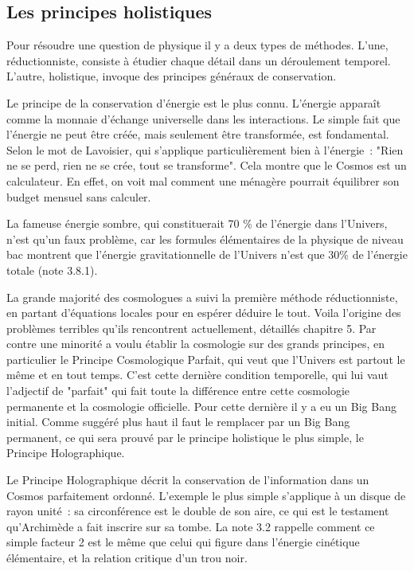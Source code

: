 \documentclass[a4paper,12pt]{article}
\begin{document}
\subsection{Les principes holistiques}

Pour résoudre une question de physique il y a deux types de méthodes. L'une, réductionniste, consiste à étudier chaque détail dans un déroulement temporel. L'autre, holistique, invoque des principes généraux de conservation.

Le principe de la conservation d'énergie est le plus connu. L'énergie apparaît comme la monnaie d'échange universelle dans les interactions. Le simple fait que l'énergie ne peut être créée, mais seulement être transformée, est fondamental. Selon le mot de Lavoisier, qui s'applique particulièrement bien à l'énergie : "Rien ne se perd, rien ne se crée, tout se transforme". Cela montre que le Cosmos est un calculateur.  En effet, on voit mal comment une ménagère pourrait équilibrer son budget mensuel sans calculer.

La fameuse énergie sombre, qui constituerait 70 \% de l'énergie dans l'Univers, n'est qu'un faux problème, car les formules élémentaires de la physique de niveau bac montrent que l'énergie gravitationnelle de l'Univers n'est que 30\% de l'énergie totale (note 3.8.1). 

La grande majorité des cosmologues a suivi la première méthode réductionniste, en partant d'équations locales pour en espérer déduire le tout. Voila l'origine des problèmes terribles qu'ils rencontrent actuellement, détaillés chapitre 5. Par contre une minorité a voulu établir la cosmologie sur des grands principes, en particulier le Principe Cosmologique Parfait, qui veut que l'Univers est partout le même et en tout temps. C'est cette dernière condition temporelle, qui lui vaut l'adjectif de "parfait" qui fait toute la différence entre cette cosmologie permanente et la cosmologie officielle. Pour cette dernière il y a eu un Big Bang initial. Comme suggéré plus haut il faut le remplacer par un Big Bang permanent, ce qui sera prouvé par le principe holistique le plus simple, le Principe Holographique.

 Le Principe Holographique décrit la conservation de l'information dans un Cosmos parfaitement ordonné. L'exemple le plus simple s'applique à un disque de rayon unité : sa circonférence est le double de son aire, ce qui est le testament qu'Archimède a fait inscrire sur sa tombe. La note 3.2 rappelle comment ce simple facteur 2 est le même que celui qui figure dans l'énergie cinétique élémentaire, et la relation critique d'un trou noir.
\end{document}
